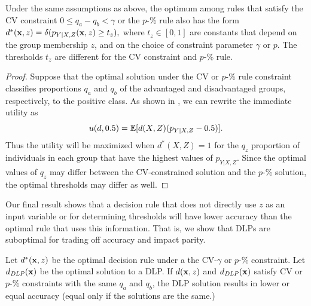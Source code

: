 \begin{prop}
	Under the same assumptions as above, 
    the optimum among rules 
    that satisfy the CV constraint $0 \le q_a - q_b < \gamma$ 
    or the $p$-\% rule also has the form
$d^*(\mathbf x,z) = \delta(p_{Y|X, Z}(\mathbf x,z) \ge t_{z}),$
 where $t_{z} \in [0,1]$ are constants 
 that depend on the group membership $z$, 
 and on the choice of constraint parameter $\gamma$ or $p$.  
 The thresholds $t_z$ are different 
 for the CV constraint and $p$-\% rule.
\label{prop:cv_opt}
\end{prop}

\begin{proof}
Suppose that the optimal solution under the CV or $p$-\% rule constraint classifies proportions $q_a$ and $q_b$
of the advantaged and disadvantaged groups, respectively,
to the positive class. 
As shown in \citet{corbett2017algorithmic}, 
we can rewrite the immediate utility as 
\[
 u(d,0.5) = \mathbb{E}[d(X, Z)(p_{Y|X, Z} - 0.5)].
\]
Thus the utility will be maximized 
 when $d^*(X,Z) = 1$ 
for the $q_z$ proportion of individuals in each group 
that have the highest values of $p_{Y|X, Z}$.  
Since the optimal values of $q_z$ 
may differ between the CV-constrained solution 
and the $p$-\% solution, 
the optimal thresholds may differ as well.
\end{proof}

Our final result
shows that a decision rule 
that does not directly use $z$ as an input variable 
or for determining thresholds 
will have lower accuracy 
than the optimal rule 
that uses this information.  
That is, we show that DLPs are suboptimal 
for trading off accuracy and impact parity.

\begin{theorem}
	Let $d^*(\mathbf x, z)$ be the optimal decision rule under a the CV-$\gamma$ or $p$-\% constraint. 
    Let $d_{\mathit{DLP}}(\mathbf x)$ be the optimal solution to a DLP. 
        If $d(\mathbf x,z)$ and $d_{\mathit{DLP}}(\mathbf x)$ satisfy CV or $p$-\% constraints 
        with the same $q_a$ and $q_b$, 
        the DLP solution results in lower or equal accuracy 
        (equal only if the solutions are the same.)
\end{theorem}


